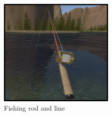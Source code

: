 \documentclass[10pt,journal,compsoc,onecolumn, draftclsnofoot]{IEEEtran}
\begin{document}
\begin{figure}[h]
    \centering
    \includegraphics[width=0.5\textwidth]{fishingrod.png}
    \caption{Fishing rod and line}
\end{figure}
\end{document}
